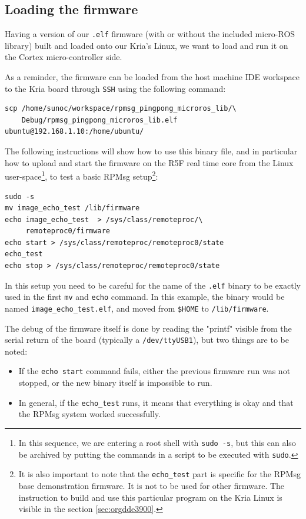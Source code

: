 \documentclass[10pt]{article}
\begin{document}
\clearpage
\subsection{Loading the firmware}
\label{sec:org7608166}
Having a version of our \texttt{.elf} firmware (with or without the included
micro-ROS library) built and loaded onto our Kria's Linux, we want to load and run it
on the Cortex micro-controller side.

As a reminder, the firmware can be loaded from the host machine IDE workspace
to the Kria board through \texttt{SSH} using the following command:
\begin{verbatim}
scp /home/sunoc/workspace/rpmsg_pingpong_microros_lib/\
    Debug/rpmsg_pingpong_microros_lib.elf  ubuntu@192.168.1.10:/home/ubuntu/
\end{verbatim}

The following instructions will show how to use this binary file, and
in particular how to upload and start the firmware on the R5F real time core
from the Linux user-space\footnote{In this sequence, we are entering a root shell with \texttt{sudo -s}, but this can
also be archived by putting the commands in a script to be executed with \texttt{sudo}.}, to test a basic RPMsg setup\footnote{It is also important to note that the \texttt{echo\_test} part is specific for the
RPMsg base demonstration firmware. It is not to be used for other firmware.
The instruction to build and use this particular program on the Kria Linux
is visible in the section \ref{sec:orgdde3900}.}:
\begin{verbatim}
sudo -s
mv image_echo_test /lib/firmware
echo image_echo_test  > /sys/class/remoteproc/\
     remoteproc0/firmware
echo start > /sys/class/remoteproc/remoteproc0/state
echo_test
echo stop > /sys/class/remoteproc/remoteproc0/state
\end{verbatim}

In this setup you need to be careful for the name of the \texttt{.elf} binary to be exactly used
in the first \texttt{mv} and \texttt{echo} command. In this example, the binary would be named
\texttt{image\_echo\_test.elf}, and moved from \texttt{\$HOME} to \texttt{/lib/firmware}.

The debug of the firmware itself is done by reading the "printf" visible from the serial
return of the board (typically a \texttt{/dev/ttyUSB1}), but two things are to be noted:
\begin{itemize}
\item If the \texttt{echo start} command fails, either the previous firmware run was not stopped,
or the new binary itself is impossible to run.
\item In general, if the \texttt{echo\_test} runs, it means that everything is okay and that
the RPMsg system worked successfully.
\end{itemize}
\end{document}
